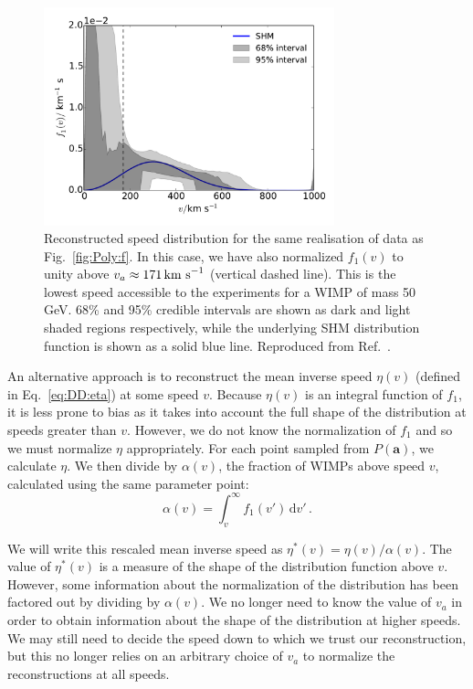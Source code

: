 \begin{figure}[t]
\centering
  \includegraphics[width=0.75\textwidth]{Poly/f_SHM_scaled_line.pdf}
  \caption[Reconstructed speed distribution for a single realisation of data using the polynomial $\ln f(v)$ parametrisation, normalised to unity above the threshold speed of the experiments]{Reconstructed speed distribution for the same realisation of data as Fig.~\ref{fig:Poly:f}. In this case, we have also normalized $f_1(v)$ to unity above $v_a \approx 171 \,\textrm{km s}^{-1}$ (vertical dashed line). This is the lowest speed accessible to the experiments for a WIMP of mass 50 GeV. 68\% and 95\% credible intervals are shown as dark and light shaded regions respectively, while the underlying SHM distribution function is shown as a solid blue line. Reproduced from Ref.~\cite{Kavanagh:2014}.}
  \label{fig:Poly:f_scaled}
\end{figure}

An alternative approach is to reconstruct the mean inverse speed $\eta(v)$ (defined in Eq.~\ref{eq:DD:eta}) at some speed $v$. Because $\eta(v)$ is an integral function of $f_1$, it is less prone to bias as it takes into account the full shape of the distribution at speeds greater than $v$. However, we do not know the normalization of $f_1$ and so we must normalize $\eta$ appropriately. For each point sampled from $P(\textbf{a})$, we calculate $\eta$. We then divide by $\alpha(v)$, the fraction of WIMPs above speed $v$, calculated using the same parameter point:
\begin{equation}
\label{eq:alpha}
\alpha(v) = \int_{v}^{\infty} f_1(v') \, \textrm{d}v'\,.
\end{equation}

We will write this rescaled mean inverse speed as $\eta^*(v) = \eta(v)/\alpha(v)$. The value of $\eta^*(v)$ is a measure of the shape of the distribution function above $v$. However, some information about the normalization of the distribution has been factored out by dividing by $\alpha(v)$. We no longer need to know the value of $v_a$ in order to obtain information about the shape of the distribution at higher speeds. We may still need to decide the speed down to which we trust our reconstruction, but this no longer relies on an arbitrary choice of $v_a$ to normalize the reconstructions at all speeds.

